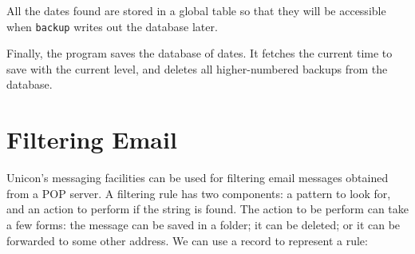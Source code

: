 All the dates found are stored in a global table so that they will be
accessible when \texttt{backup} writes out the database later.


Finally, the program saves the database of dates. It fetches the current
time to save with the current level, and deletes all
higher-numbered backups from the database.


\section{Filtering Email}

Unicon's messaging facilities can be used for filtering
email messages obtained from a POP server. A filtering rule has two
components: a pattern to look for, and an action to perform if the
string is found. The action to be perform can take a few forms: the
message can be saved in a folder; it can be deleted; or it can be
forwarded to some other address. We can use a record to represent a
rule:

